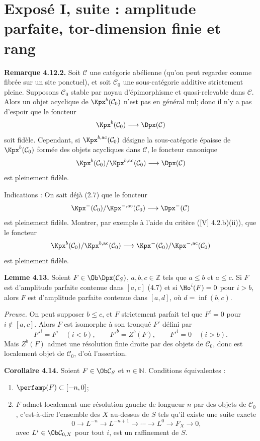 \documentclass[11pt]{article}
\begin{document}
\section*{Exposé I, suite : amplitude parfaite, tor-dimension finie et rang}

\textbf{Remarque 4.12.2.} Soit \(\mathcal C\) une catégorie abélienne (qu'on peut regarder comme fibrée sur un site ponctuel), et soit \(\mathcal C_0\) une sous-catégorie additive strictement pleine. Supposons \(\mathcal C_0\) stable par noyau d'épimorphisme et quasi-relevable dans \(\mathcal C\). Alors un objet acyclique de \(\Kpx^b(\mathcal C_0)\) n'est pas en général nul; donc il n'y a pas d'espoir que le foncteur
\[
  \Kpx^b(\mathcal C_0)\longrightarrow \Dpx(\mathcal C)
\]
soit fidèle. Cependant, si \(\Kpx^{b,\mathrm{ac}}(\mathcal C_0)\) désigne la sous-catégorie épaisse de \(\Kpx^b(\mathcal C_0)\) formée des objets acycliques dans \(\mathcal C\), le foncteur canonique
\[
  \Kpx^b(\mathcal C_0)/\Kpx^{b,\mathrm{ac}}(\mathcal C_0)
  \longrightarrow \Dpx(\mathcal C)
\]
est pleinement fidèle.

Indications : On sait déjà (2.7) que le foncteur
\[
  \Kpx^-(\mathcal C_0)/\Kpx^{-,\mathrm{ac}}(\mathcal C_0)
  \longrightarrow \Dpx^-(\mathcal C)
\]
est pleinement fidèle. Montrer, par exemple à l'aide du critère ([V] 4.2.b)(ii)), que le foncteur
\[
  \Kpx^b(\mathcal C_0)/\Kpx^{b,\mathrm{ac}}(\mathcal C_0)
  \longrightarrow
  \Kpx^-(\mathcal C_0)/\Kpx^{-,\mathrm{ac}}(\mathcal C_0)
\]
est pleinement fidèle.

\textbf{Lemme 4.13.} Soient \(F\in\Ob\Dpx(\mathcal C_S)\), \(a,b,c\in\mathbb Z\) tels que \(a\leq b\) et \(a\leq c\). Si \(F\) est d'amplitude parfaite contenue dans \([a,c]\) (4.7) et si \(\Ho^i(F)=0\) pour \(i>b\), alors \(F\) est d'amplitude parfaite contenue dans \([a,d]\), où \(d=\inf(b,c)\).

\emph{Preuve.} On peut supposer \(b\leq c\), et \(F\) strictement parfait tel que \(F^i=0\) pour \(i\notin[a,c]\). Alors \(F\) est isomorphe à son tronqué \(F'\) défini par
\[
  F'^i=F^i\quad (i<b),\qquad F'^b=Z^b(F),\qquad F'^i=0\quad (i>b).
\]
Mais \(Z^b(F)\) admet une résolution finie droite par des objets de \(\mathcal C_0\), donc est localement objet de \(\mathcal C_0\), d'où l'assertion.

\textbf{Corollaire 4.14.} Soient \(F\in\Ob\mathcal C_S\) et \(n\in\mathbb N\). Conditions équivalentes :
\begin{enumerate}[label=(\roman*)]
\item \(\perfamp(F)\subset[-n,0]\);
\item \(F\) admet localement une résolution gauche de longueur \(n\) par des objets de \(\mathcal C_0\), c'est-à-dire l'ensemble des \(X\) au-dessus de \(S\) tels qu'il existe une suite exacte
\[
  0\longrightarrow L^{-n}\longrightarrow L^{-n+1}\longrightarrow \cdots
  \longrightarrow L^0\longrightarrow F_X\longrightarrow 0,
\]
avec \(L^i\in\Ob\mathcal C_{0,X}\) pour tout \(i\), est un raffinement de \(S\).
\end{enumerate}
\end{document}
